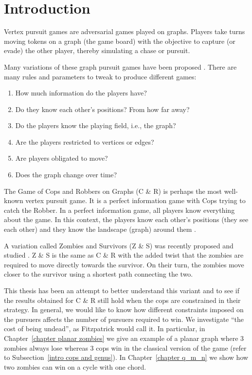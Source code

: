 \chapter{Introduction}\label{chapter intro}

Vertex pursuit games are adversarial games played on graphs.
Players take turns moving tokens on a graph (the game board) with
the objective to capture (or evade) the other player, thereby simulating a chase or pursuit.

Many variations of these graph pursuit games have been proposed \cite{bonato2017graph, bellman1967graphs}. There are many rules and parameters to tweak to produce different games:

\begin{enumerate}
\item How much information do the players have?
\item Do they know each other's positions? From how far away?
\item Do the players know the playing field, i.e., the graph?
\item Are the players restricted to vertices or edges?
\item Are players obligated to move?
\item Does the graph change over time?
\end{enumerate}

The Game of Cops and Robbers on Graphs (C \& R) \cite{bonato2011game} is perhaps the most
well-known vertex pursuit game. It is a perfect information game with Cops trying
to catch the Robber. In a perfect information game, all players know everything about the game.
In this context, the players know each other's positions (they see each other) and they
know the landscape (graph) around them \cite{schaefer1978complexity}.

A variation called Zombies and Survivors (Z \& S) was recently proposed and studied  \cite{fitzpatrick2016deterministic, fitzpatrick2018game}.
Z \& S is the same as C \& R with the added twist that the zombies are required to move directly towards the survivor. On their turn, the zombies move closer to the survivor using a shortest path connecting the two.

This thesis has been an attempt to better understand this variant and
to see if the results obtained for C \& R still hold when the cops
are constrained in their strategy. In general, we would like to know how different constraints imposed on the pursuers affects the number of pursuers required to win. We investigate ``the cost of being undead'', as Fitzpatrick \cite{fitzpatrick2016deterministic} would call it.
In particular, in Chapter~\ref{chapter planar zombies}
we give an example of a planar graph where 3 zombies always lose whereas 3 cops win in the classical version of the game (refer to Subsection~\ref{intro cops and genus}).
In Chapter~\ref{chapter q_m_n} we show how two zombies can win on a cycle with one chord.

